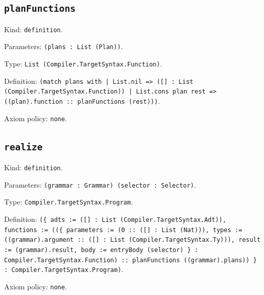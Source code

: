 \documentclass[11pt]{article}
\begin{document}
\subsection*{\texttt{planFunctions}}
\noindent Kind: \texttt{definition}.\par
\noindent Parameters: \texttt{(plans : List (Plan))}.\par
\noindent Type: \texttt{List (Compiler.TargetSyntax.Function)}.\par
\noindent Definition: \texttt{(match plans with | List.nil => ([] : List (Compiler.TargetSyntax.Function)) | List.cons plan rest => ((plan).function :: planFunctions (rest)))}.\par
\noindent Axiom policy: \texttt{none}.\par
\subsection*{\texttt{realize}}
\noindent Kind: \texttt{definition}.\par
\noindent Parameters: \texttt{(grammar : Grammar) (selector : Selector)}.\par
\noindent Type: \texttt{Compiler.TargetSyntax.Program}.\par
\noindent Definition: \texttt{(\{ adts := ([] : List (Compiler.TargetSyntax.Adt)), functions := ((\{ parameters := (0 :: ([] : List (Nat))), types := ((grammar).argument :: ([] : List (Compiler.TargetSyntax.Ty))), result := (grammar).result, body := entryBody (selector) \} : Compiler.TargetSyntax.Function) :: planFunctions ((grammar).plans)) \} : Compiler.TargetSyntax.Program)}.\par
\noindent Axiom policy: \texttt{none}.\par
\end{document}
